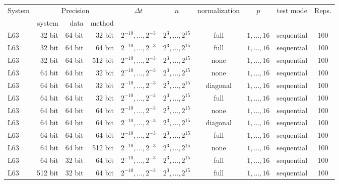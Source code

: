 \documentclass{article}
\newcommand{\stepsize}{\Delta\!t}
\begin{document}
\begin{table}[b!]
	\begin{center}
		\fontsize{8.0pt}{10pt}\selectfont
		\selectfont
		\renewcommand{\arraystretch}{1.05}
		\setlength{\tabcolsep}{0.5em}
		\begin{tabular}{lrrrcccccc}
			\toprule
			System & \multicolumn{3}{c}{Precision} & $\stepsize$ & $n$ & normalization & $p$ & test mode & Reps.\\
			\cmidrule(lr){2-4}
			& system & data & method & & & & & & \\
			\midrule
			L63 & 32 bit & 64 bit & 32 bit & $2^{-10}, \dots, 2^{-3}$ & $2^3, \dots, 2^{15}$ & full & $1, \dots, 16$ & sequential & 100\\
			L63 & 32 bit & 64 bit & 64 bit & $2^{-10}, \dots, 2^{-3}$ & $2^3, \dots, 2^{15}$ & full & $1, \dots, 16$ & sequential & 100\\
			L63 & 32 bit & 64 bit & 512 bit & $2^{-10}, \dots, 2^{-3}$ & $2^3, \dots, 2^{15}$ & none & $1, \dots, 16$ & sequential & 100\\
			L63 & 64 bit & 64 bit & 32 bit & $2^{-10}, \dots, 2^{-3}$ & $2^3, \dots, 2^{15}$ & none & $1, \dots, 16$ & sequential & 100\\
			L63 & 64 bit & 64 bit & 32 bit & $2^{-10}, \dots, 2^{-3}$ & $2^3, \dots, 2^{15}$ & diagonal & $1, \dots, 16$ & sequential & 100\\
			L63 & 64 bit & 64 bit & 32 bit & $2^{-10}, \dots, 2^{-3}$ & $2^3, \dots, 2^{15}$ & full & $1, \dots, 16$ & sequential & 100\\
			L63 & 64 bit & 64 bit & 64 bit & $2^{-10}, \dots, 2^{-3}$ & $2^3, \dots, 2^{15}$ & none & $1, \dots, 16$ & sequential & 100\\
			L63 & 64 bit & 64 bit & 64 bit & $2^{-10}, \dots, 2^{-3}$ & $2^3, \dots, 2^{15}$ & diagonal & $1, \dots, 16$ & sequential & 100\\
			L63 & 64 bit & 64 bit & 64 bit & $2^{-10}, \dots, 2^{-3}$ & $2^3, \dots, 2^{15}$ & full & $1, \dots, 16$ & sequential & 100\\
			L63 & 64 bit & 64 bit & 512 bit & $2^{-10}, \dots, 2^{-3}$ & $2^3, \dots, 2^{15}$ & none & $1, \dots, 16$ & sequential & 100\\
			L63 & 64 bit & 32 bit & 64 bit & $2^{-10}, \dots, 2^{-3}$ & $2^3, \dots, 2^{15}$ & full & $1, \dots, 16$ & sequential & 100\\
			L63 & 512 bit & 32 bit & 64 bit & $2^{-10}, \dots, 2^{-3}$ & $2^3, \dots, 2^{15}$ & full & $1, \dots, 16$ & sequential & 100\\

\end{tabular}
\end{center}
\end{table}
\end{document}
